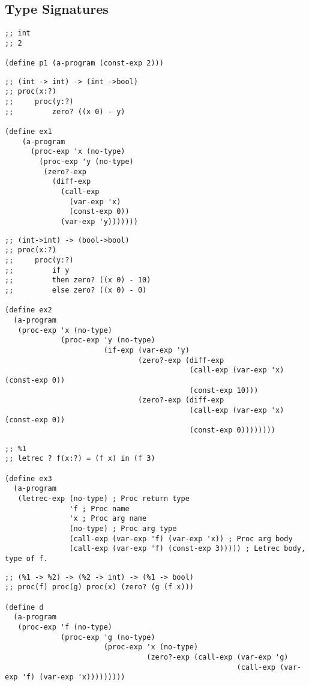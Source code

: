 \documentclass[../main.tex]{subfiles}
\begin{document}
\subsection{Type Signatures}

\begin{lstlisting}
;; int
;; 2

(define p1 (a-program (const-exp 2)))
\end{lstlisting}

\begin{lstlisting}
;; (int -> int) -> (int ->bool)
;; proc(x:?)
;;     proc(y:?)
;;         zero? ((x 0) - y)

(define ex1
    (a-program
      (proc-exp 'x (no-type)
        (proc-exp 'y (no-type)
         (zero?-exp
           (diff-exp
             (call-exp
               (var-exp 'x)
               (const-exp 0))
             (var-exp 'y)))))))
\end{lstlisting}

\begin{lstlisting}
;; (int->int) -> (bool->bool)
;; proc(x:?)
;;     proc(y:?)
;;         if y
;;         then zero? ((x 0) - 10)
;;         else zero? ((x 0) - 0)

(define ex2
  (a-program
   (proc-exp 'x (no-type)
             (proc-exp 'y (no-type)
                       (if-exp (var-exp 'y)
                               (zero?-exp (diff-exp
                                           (call-exp (var-exp 'x) (const-exp 0))
                                           (const-exp 10)))
                               (zero?-exp (diff-exp
                                           (call-exp (var-exp 'x) (const-exp 0))
                                           (const-exp 0))))))))
\end{lstlisting}

\begin{lstlisting}
;; %1
;; letrec ? f(x:?) = (f x) in (f 3)

(define ex3
  (a-program
   (letrec-exp (no-type) ; Proc return type
               'f ; Proc name
               'x ; Proc arg name
               (no-type) ; Proc arg type
               (call-exp (var-exp 'f) (var-exp 'x)) ; Proc arg body
               (call-exp (var-exp 'f) (const-exp 3))))) ; Letrec body, type of f.

\end{lstlisting}

\begin{lstlisting}
;; (%1 -> %2) -> (%2 -> int) -> (%1 -> bool)
;; proc(f) proc(g) proc(x) (zero? (g (f x)))

(define d
  (a-program
   (proc-exp 'f (no-type)
             (proc-exp 'g (no-type)
                       (proc-exp 'x (no-type)
                                 (zero?-exp (call-exp (var-exp 'g)
                                                      (call-exp (var-exp 'f) (var-exp 'x)))))))))
\end{lstlisting}
\end{document}
